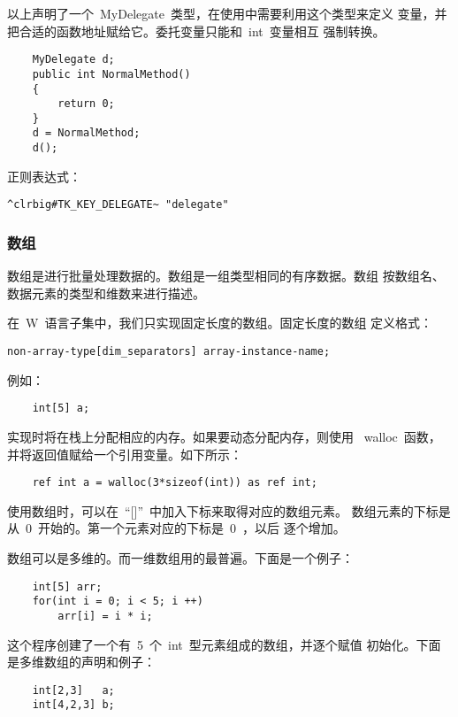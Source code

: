 以上声明了一个~MyDelegate~类型，在使用中需要利用这个类型来定义
变量，并把合适的函数地址赋给它。委托变量只能和~int~变量相互
强制转换。

\ttfamily
\begin{lstlisting}
    MyDelegate d;
    public int NormalMethod()
    {
        return 0;
    }
    d = NormalMethod;
    d();
\end{lstlisting}

正则表达式：

\begin{Verbatim}[frame=single, commandchars=^\#\~]
    ^clrbig#TK_KEY_DELEGATE~ "delegate"
\end{Verbatim}

\subsubsection{数组}

数组是进行批量处理数据的。数组是一组类型相同的有序数据。数组
按数组名、数据元素的类型和维数来进行描述。

在~W~语言子集中，我们只实现固定长度的数组。固定长度的数组
定义格式：
\begin{Verbatim}[frame=single, commandchars=^\#\~]
    non-array-type[dim_separators] array-instance-name;
\end{Verbatim}

例如：
\ttfamily
\begin{lstlisting}
    int[5] a;
\end{lstlisting}

实现时将在栈上分配相应的内存。如果要动态分配内存，则使用
~walloc~函数，并将返回值赋给一个引用变量。如下所示：
\ttfamily
\begin{lstlisting}
    ref int a = walloc(3*sizeof(int)) as ref int;
\end{lstlisting}

使用数组时，可以在~``[]''~中加入下标来取得对应的数组元素。
数组元素的下标是从~0~开始的。第一个元素对应的下标是~0~，以后
逐个增加。

数组可以是多维的。而一维数组用的最普遍。下面是一个例子：
\ttfamily
\begin{lstlisting}
    int[5] arr;
    for(int i = 0; i < 5; i ++)
        arr[i] = i * i;
\end{lstlisting}

这个程序创建了一个有~5~个~int~型元素组成的数组，并逐个赋值
初始化。下面是多维数组的声明和例子：
\ttfamily
\begin{lstlisting}
    int[2,3]   a;
    int[4,2,3] b;
\end{lstlisting}

